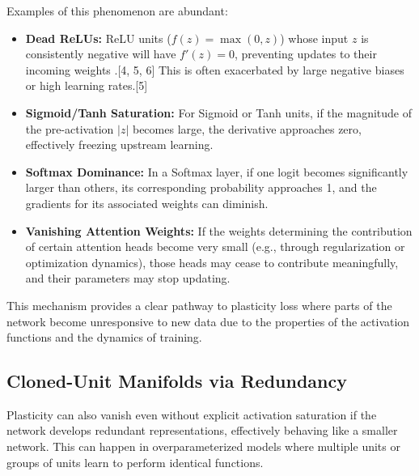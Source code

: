 \documentclass{article}
\begin{document}
Examples of this phenomenon are abundant:
\begin{itemize}
    \item \textbf{Dead ReLUs:} ReLU units ($f(z) = \max(0, z)$) whose input $z$ is consistently negative will have $f'(z)=0$, preventing updates to their incoming weights \cite{nair2010rectified}.[4, 5, 6] This is often exacerbated by large negative biases or high learning rates.[5]
    \item \textbf{Sigmoid/Tanh Saturation:} For Sigmoid or Tanh units, if the magnitude of the pre-activation $|z|$ becomes large, the derivative approaches zero, effectively freezing upstream learning.
    \item \textbf{Softmax Dominance:} In a Softmax layer, if one logit becomes significantly larger than others, its corresponding probability approaches 1, and the gradients for its associated weights can diminish.
    \item \textbf{Vanishing Attention Weights:} If the weights determining the contribution of certain attention heads become very small (e.g., through regularization or optimization dynamics), those heads may cease to contribute meaningfully, and their parameters may stop updating.
\end{itemize}
This mechanism provides a clear pathway to plasticity loss where parts of the network become unresponsive to new data due to the properties of the activation functions and the dynamics of training.

\subsection{Cloned-Unit Manifolds via Redundancy}

Plasticity can also vanish even without explicit activation saturation if the network develops redundant representations, effectively behaving like a smaller network. This can happen in overparameterized models where multiple units or groups of units learn to perform identical functions.
\end{document}
